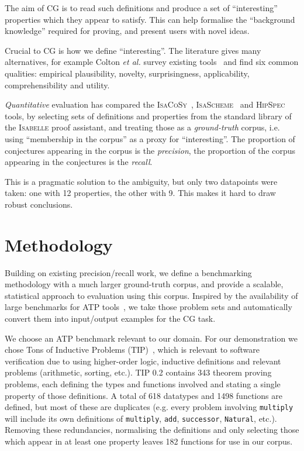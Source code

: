 \documentclass[]{default}
\newcommand{\etal}{{\em et al.}}
\begin{document}
The aim of CG is to read such definitions and produce a set of ``interesting''
properties which they appear to satisfy. This can help formalise the
``background knowledge'' required for proving, and present users with novel
ideas.

Crucial to CG is how we define ``interesting''. The literature gives many
alternatives, for example Colton \etal{} survey existing
tools~\cite{colton2000notion} and find six common qualities: empirical
plausibility, novelty, surprisingness, applicability, comprehensibility and
utility.

\emph{Quantitative} evaluation has compared the
\textsc{IsaCoSy}~\cite{Johansson.Dixon.Bundy:conjecture-generation},
\textsc{IsaScheme}~\cite{Montano-Rivas.McCasland.Dixon.ea:2012} and
\textsc{HipSpec}~\cite{claessen2013automating} tools, by selecting sets of
definitions and properties from the standard library of the \textsc{Isabelle}
proof assistant, and treating those as a \emph{ground-truth} corpus, i.e. using
``membership in the corpus'' as a proxy for ``interesting''. The proportion of
conjectures appearing in the corpus is the \emph{precision}, the proportion of
the corpus appearing in the conjectures is the \emph{recall}.

This is a pragmatic solution to the ambiguity, but only two datapoints were
taken: one with 12 properties, the other with 9. This makes it hard to draw
robust conclusions.

\section{Methodology}

Building on existing precision/recall work, we define a benchmarking methodology
with a much larger ground-truth corpus, and provide a scalable, statistical
approach to evaluation using this corpus. Inspired by the availability of large
benchmarks for ATP tools~\cite{pelletier2002development}, we take those problem
sets and automatically convert them into input/output examples for the CG task.

We choose an ATP benchmark relevant to our domain. For our demonstration we
chose Tons of Inductive Problems (TIP)~\cite{claessen2015tip}, which is relevant
to software verification due to using higher-order logic, inductive definitions
and relevant problems (arithmetic, sorting, etc.). TIP 0.2 contains 343 theorem
proving problems, each defining the types and functions involved and stating a
single property of those definitions. A total of 618 datatypes and 1498
functions are defined, but most of these are duplicates (e.g. every problem
involving \texttt{multiply} will include its own definitions of
\texttt{multiply}, \texttt{add}, \texttt{successor}, \texttt{Natural}, etc.).
Removing these redundancies, normalising the definitions and only selecting
those which appear in at least one property leaves 182 functions for use in our
corpus.
\end{document}
